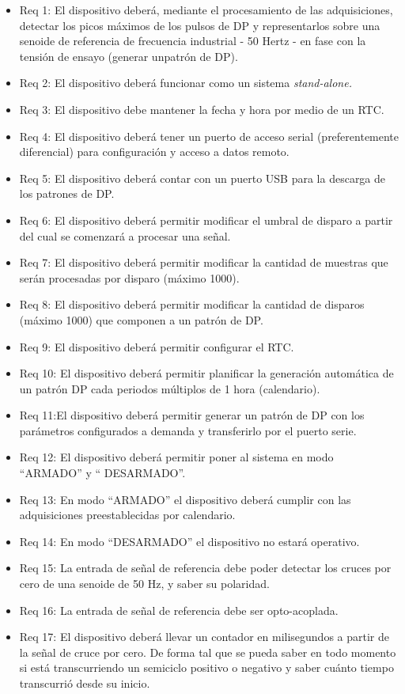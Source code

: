 \begin{itemize}
\item Req 1: El dispositivo deberá, mediante el procesamiento de las adquisiciones, detectar los picos máximos de los pulsos de DP y representarlos sobre una senoide de referencia de frecuencia industrial - 50 Hertz - en fase con la tensión de ensayo (generar unpatrón de DP).
\item Req 2: El dispositivo deberá funcionar como un sistema \it{stand-alone}.
\item Req 3: El dispositivo debe mantener la fecha y hora por medio de un RTC.
\item Req 4: El dispositivo deberá tener un puerto de acceso serial (preferentemente diferencial) para configuración y acceso a datos remoto.
\item Req 5: El dispositivo deberá contar con un puerto USB para la descarga de los patrones de DP.
\item Req 6: El dispositivo deberá permitir modificar el umbral de disparo a partir del cual se comenzará a procesar una señal.
\item Req 7: El dispositivo deberá permitir modificar la cantidad de muestras que serán procesadas por disparo (máximo 1000).
\item Req 8: El dispositivo deberá permitir modificar la cantidad de disparos (máximo 1000) que componen a un patrón de DP.
\item Req 9: El dispositivo deberá permitir configurar el RTC.
\item Req 10: El dispositivo deberá permitir planificar la generación automática de un patrón DP cada periodos múltiplos de 1 hora (calendario).
\item Req 11:El dispositivo deberá permitir generar un patrón de DP con los parámetros configurados a demanda y transferirlo por el puerto serie.
\item Req 12: El dispositivo deberá permitir poner al sistema en modo “ARMADO” y “ DESARMADO”.
\item Req 13: En modo “ARMADO” el dispositivo deberá cumplir con las adquisiciones preestablecidas por calendario.
\item Req 14: En modo “DESARMADO” el dispositivo no estará operativo.
\item Req 15: La entrada de señal de referencia debe poder detectar los cruces por cero de una senoide de 50 Hz, y saber su polaridad.
\item Req 16: La entrada de señal de referencia debe ser opto-acoplada.
\item Req 17: El dispositivo deberá llevar un contador en milisegundos a partir de la señal de cruce por cero. De forma tal que se pueda saber en todo momento si está transcurriendo un semiciclo positivo o negativo y saber cuánto tiempo transcurrió desde su inicio.

\end{itemize}
